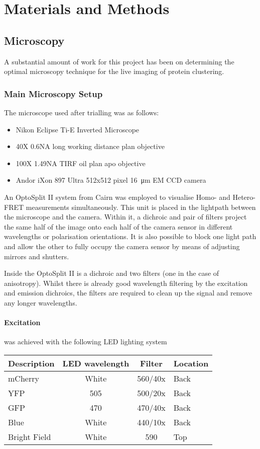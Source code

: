 \documentclass[../main.tex]{subfiles}
\begin{document}
\section{Materials and Methods}

\subsection{Microscopy}

A substantial amount of work for this project has been on determining the optimal microscopy technique for the live imaging of protein clustering.

\subsubsection{Main Microscopy Setup}

The microscope used after trialling was as follows:

\begin{itemize}
\item{Nikon Eclipse Ti-E Inverted Microscope}
\item{40X 0.6NA long working distance plan objective}
\item{100X 1.49NA TIRF oil plan apo objective}
\item{Andor iXon 897 Ultra 512x512 pixel \SI{16}{\micro\meter} EM CCD camera}
\end{itemize}

An OptoSplit II system from Cairn was employed to visualise Homo- and Hetero- FRET measurements simultaneously. This unit is placed in the lightpath between the microscope and the camera. Within it, a dichroic and pair of filters project the same half of the image onto each half of the camera sensor in different wavelengths or polarisation orientations. It is also possible to block one light path and allow the other to fully occupy the camera sensor by means of adjusting mirrors and shutters.

Inside the OptoSplit II is a dichroic and two filters (one in the case of anisotropy). Whilst there is already good wavelength filtering by the excitation and emission dichroics, the filters are required to clean up the signal and remove any longer wavelengths.

\paragraph{Excitation} was achieved with the following LED lighting system
\begin{center}
\begin{tabular}{l|c|c|l}
\textbf{Description}	&	\textbf{LED wavelength}	&	\textbf{Filter}	&	\textbf{Location} \\\hline
mCherry	&	White	&	560/40x	&	Back	\\
YFP		&	505		&	500/20x	&	Back\\
GFP		&	470		&	470/40x	&	Back\\
Blue		&	White	&	440/10x	&	Back\\
Bright Field		&	White	&	590	&	Top
\end{tabular}
\end{center}
\end{document}
